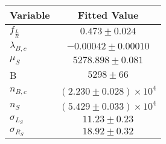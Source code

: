 \begin{tabular}[t]{lc}
\hline
Variable &Fitted Value\\
\hline\hline
$f_{\frac{L}{R}}$&$0.473\pm0.024$\\
\hline
$\lambda_{B,c}$&$-0.00042\pm0.00010$\\
\hline
$\mu_S$&$5278.898\pm0.081$\\
\hline
B&$5298\pm66$\\
\hline
$n_{B,c}$&$(2.230\pm0.028)\times 10^4$\\
\hline
$n_S$&$(5.429\pm0.033)\times 10^4$\\
\hline
$\sigma_{L_S}$&$11.23\pm0.23$\\
\hline
$\sigma_{R_S}$&$18.92\pm0.32$\\
\hline
\end{tabular}